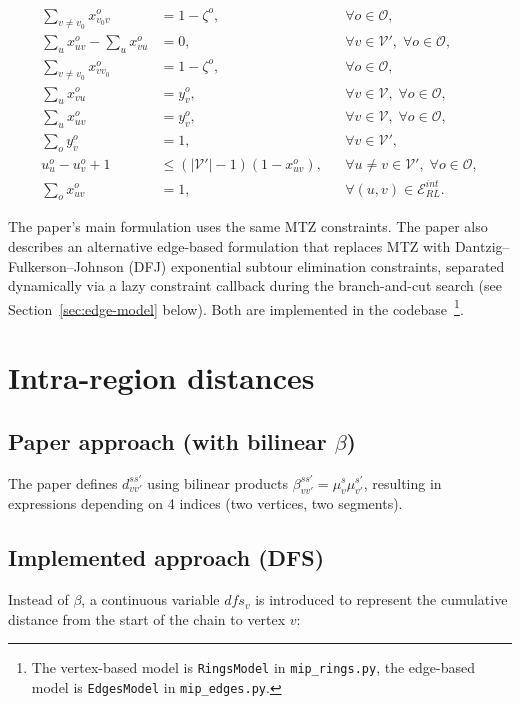 \documentclass[12pt]{article}
\begin{document}
\begin{align}
  \sum_{v\neq v_0} x_{v_0 v}^o &= 1 - \zeta^o,
        && \forall o\in\mathcal O, \tag{DP1}\\
  \sum_{u} x_{uv}^o - \sum_{u} x_{vu}^o &= 0,
        && \forall v\in\mathcal V',\; \forall o\in\mathcal O, \tag{DP2}\\
  \sum_{v\neq v_0} x_{v v_0}^o &= 1 - \zeta^o,
        && \forall o\in\mathcal O, \tag{DP3}\\
  \sum_{u} x_{vu}^o &= y_v^o,
        && \forall v\in\mathcal V,\; \forall o\in\mathcal O, \tag{DP4}\\
  \sum_{u} x_{uv}^o &= y_v^o,
        && \forall v\in\mathcal V,\; \forall o\in\mathcal O, \tag{DP5}\\
  \sum_{o} y_v^o &= 1,
        && \forall v\in\mathcal V', \tag{DP6}\\
  u_u^o - u_v^o + 1 &\le (|\mathcal V'|-1)(1-x_{uv}^o),
        && \forall u\neq v\in\mathcal V',\; \forall o\in\mathcal O, \tag{DP7 (MTZ)}\\
  \sum_{o} x_{uv}^o &= 1,
        && \forall (u,v)\in\mathcal E_{RL}^{int}. \tag{DP8}
\end{align}

\noindent The paper's main formulation uses the same MTZ constraints. The paper also
describes an alternative edge-based formulation that replaces MTZ with
Dantzig--Fulkerson--Johnson (DFJ) exponential subtour elimination constraints,
separated dynamically via a lazy constraint callback during the branch-and-cut
search (see Section~\ref{sec:edge-model} below). Both are implemented in the
codebase~\footnote{The vertex-based model is \texttt{RingsModel} in
\texttt{mip\_rings.py}, the edge-based model is \texttt{EdgesModel} in
\texttt{mip\_edges.py}.}.

\section{Intra-region distances}

\subsection*{Paper approach (with bilinear $\beta$)}
The paper defines $d_{vv'}^{ss'}$ using bilinear products
$\beta_{vv'}^{ss'} = \mu_v^s \mu_{v'}^{s'}$, resulting in expressions
depending on 4 indices (two vertices, two segments).

\subsection*{Implemented approach (DFS)}
Instead of $\beta$, a continuous variable $dfs_v$ is introduced to represent
the cumulative distance from the start of the chain to vertex $v$:
\end{document}
